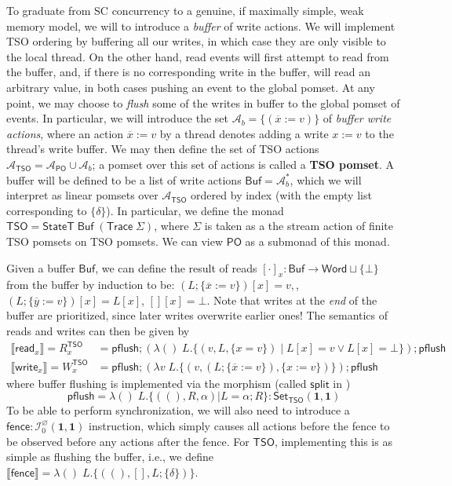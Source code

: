 \documentclass[acmsmall,screen,review]{acmart}
\newcommand{\mc}[1]{\ensuremath{\mathcal{#1}}}
\newcommand{\mb}[1]{\ensuremath{\mathbf{#1}}}
\newcommand{\ms}[1]{\ensuremath{\mathsf{#1}}}
\newcommand{\dnt}[1]{\llbracket{#1}\rrbracket}
\newcommand{\bufloc}[1]{\overline{#1}}
\begin{document}
To graduate from SC concurrency to a genuine, if maximally simple, weak memory
model, we will to introduce a \textit{buffer} of write actions. We will
implement TSO ordering by buffering all our writes, in which case they are only
visible to the local thread. On the other hand, read events will first attempt
to read from the buffer, and, if there is no corresponding write in the buffer,
will read an arbitrary value, in both cases pushing an event to the global
pomset. At any point, we may choose to \textit{flush} some of the writes in
buffer to the global pomset of events. In particular, we will introduce the set
\(\mc{A}_b = \{(\bufloc{x} := v)\}\) of \textit{buffer write actions}, where an
action \(\bufloc{x} := v\) by a thread denotes adding a write \(x := v\) to the
thread's write buffer. We may then define the set of TSO actions
\(\mc{A}_{\ms{TSO}} = \mc{A}_{\ms{PO}} \cup \mc{A}_b\); a pomset over this set
of actions is called a \textbf{TSO pomset}. A buffer will be defined to be a
list of write actions \(\ms{Buf} = \mc{A}_b^*\), which we will interpret as
linear pomsets over \(\mc{A}_{\ms{TSO}}\) ordered by index (with the empty list
corresponding to \(\{\delta\}\)). In particular, we define the monad \(\ms{TSO}
= \ms{StateT}\;\ms{Buf}\;(\ms{Trace}\;\Sigma)\), where \(\Sigma\) is taken as a
the stream action of finite TSO pomsets on TSO pomsets. We can view
\(\ms{PO}\) as a submonad of this monad.

Given a buffer \(\ms{Buf}\), we can define the result of reads \([\cdot]_x:
\ms{Buf} \to \ms{Word} \sqcup \{\bot\}\) from the buffer by induction to be:
\(
  (L;\{\bufloc{x} := v\})[x] = v,
\),
\(
  (L;\{\bufloc{y} := v\})[x] = L[x]
\),
\(
  [][x] = \bot
\).
Note that writes at the \textit{end} of the buffer are prioritized, since later
writes overwrite earlier ones! The semantics of reads and writes can then be
given by
\begin{equation}
  \begin{aligned}
  \dnt{\ms{read}_x} = R_x^{\ms{TSO}} 
    &= \ms{pflush};(\lambda ()\;L. \{(v, L, \{x = v\}) \mid L[x] = v \lor L[x] = \bot\});\ms{pflush} \\
  \dnt{\ms{write}_x} = W_x^{\ms{TSO}}
    &= \ms{pflush};(\lambda v\;L. \{(v, (L;\{\bufloc{x} := v\}), \{x := v\})\});\ms{pflush}
  \end{aligned}
\end{equation}
where buffer flushing is implemented via the morphism (called \(\ms{split}\) in
\cite{sparky})
\begin{equation}
  \ms{pflush} = \lambda ()\;L. \{((), R, \alpha) | L = \alpha;R\}
  : \ms{Set}_{\ms{TSO}}(\mb{1}, \mb{1})
\end{equation}
To be able to perform synchronization, we will also need to introduce a
\(\ms{fence}: \mc{I}^\varnothing_0(\mb{1}, \mb{1})\) instruction, which simply
causes all actions before the fence to be observed before any actions after the
fence. For \(\ms{TSO}\), implementing this is as simple as flushing the buffer,
i.e., we define
\(
  \dnt{\ms{fence}} = \lambda ()\;L. \{((), [], L;\{\delta\})\}
\).
\end{document}

